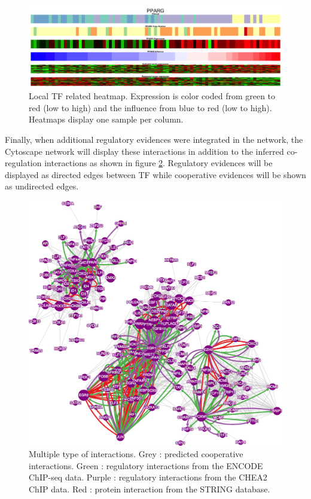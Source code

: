 \documentclass[12pt]{article}
\begin{document}
\begin{figure}[h!]
\centering
\includegraphics[width=0.7\linewidth]{fig/PPARGLocalView}
\caption{Local TF related heatmap.
Expression is color coded from green to red (low to high) and the influence from blue to red (low to high). Heatmaps display one sample per column.
}
\label{fig:PPARGLocalView}
\end{figure}

\newpage

Finally, when additional regulatory evidences were integrated in the network, the Cytoscape network will display these interactions in addition to the inferred co-regulation interactions as shown in figure \ref{fig:coregnetWithEvidence}. Regulatory evidences will be displayed as directed edges between TF while cooperative evidences will be shown as undirected edges.

\begin{figure}[h!]
\centering
\includegraphics[width=0.5\linewidth]{fig/coregnetWithEvidence}
\caption{Multiple type of interactions. Grey : predicted cooperative interactions. Green : regulatory interactions from the ENCODE ChIP-seq data. Purple : regulatory interactions from the CHEA2 ChIP data. Red : protein interaction from the STRING database. }
\label{fig:coregnetWithEvidence}
\end{figure}
\end{document}
